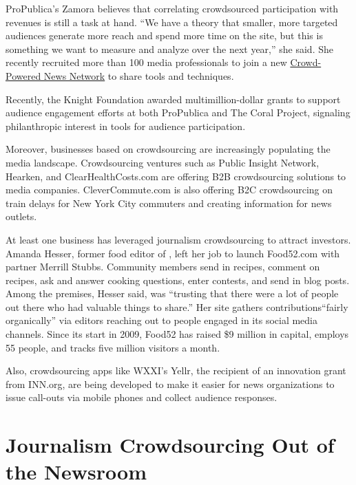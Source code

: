 \begin{itemize}
\begin{itemize}
ProPublica’s Zamora believes that correlating crowdsourced participation with revenues is still a task at hand. ``We have a theory that smaller, more targeted audiences generate more reach and spend more time on the site, but this is something we want to measure and analyze over the next year,'' she said. She recently recruited more than 100 media professionals to join a new \href{https://docs.google.com/forms/d/170joKlpiLfn8qlnT7lxSJgJKq1IDg_KVilezkbE68U0/viewform}{Crowd-Powered News Network} to share tools and techniques.\autocite{CPNN} 

Recently, the Knight Foundation awarded multimillion-dollar grants to support audience engagement efforts at both ProPublica and The Coral Project, signaling philanthropic interest in tools for audience participation. 

Moreover, businesses based on crowdsourcing are increasingly populating the media landscape. Crowdsourcing ventures such as Public Insight Network, Hearken, and ClearHealthCosts.com\autocite{Jeanne} are offering B2B crowdsourcing solutions to media companies. CleverCommute.com is also offering B2C crowdsourcing on train delays for New York City commuters and creating information for news outlets.

At least one business has leveraged journalism crowdsourcing to attract investors. Amanda Hesser, former food editor of , left her job to launch Food52.com with partner Merrill Stubbs. Community members send in recipes, comment on recipes, ask and answer cooking questions, enter contests, and send in blog posts. Among the premises, Hesser said, was ``trusting that there were a lot of people out there who had valuable things to share.''
Her site gathers contributions``fairly organically'' via editors reaching out to people engaged in its social media channels. Since its start in 2009, Food52 has raised \$9 million in capital, employs 55 people, and tracks five million visitors a month.\autocite{Hesser}

Also, crowdsourcing apps like WXXI’s Yellr, the recipient of an innovation grant from INN.org, are being developed to make it easier for news organizations to issue call-outs via mobile phones and collect audience responses. 

\chapter{Journalism Crowdsourcing Out of the Newsroom}


\end{itemize}
\end{itemize}
